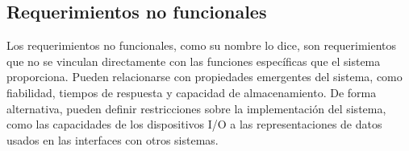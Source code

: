 	
	\subsection{Requerimientos no funcionales}
	
	Los requerimientos no funcionales, como su nombre lo dice, son requerimientos que no se vinculan directamente con las funciones específicas que el sistema proporciona. Pueden relacionarse con propiedades emergentes del sistema, como fiabilidad, tiempos de respuesta y capacidad de almacenamiento. De forma alternativa, pueden definir restricciones sobre la implementación del sistema, como las capacidades de los dispositivos I/O a las representaciones de datos usados en las interfaces con otros sistemas. \cite{15}
	
